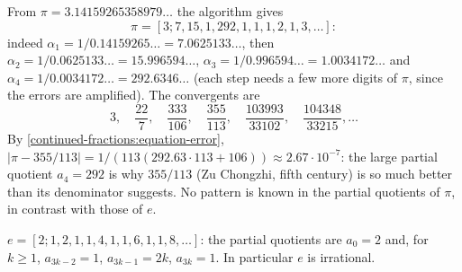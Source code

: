 \begin{example}\label{continued-fractions:example-pi}
From $\pi = 3.14159265358979\ldots$ the algorithm gives
\[
\pi = [3; 7, 15, 1, 292, 1, 1, 1, 2, 1, 3, \ldots]:
\]
indeed $\alpha_1 = 1/0.14159265\ldots = 7.0625133\ldots$, then $\alpha_2 = 1/0.0625133\ldots = 15.996594\ldots$, $\alpha_3 = 1/0.996594\ldots = 1.0034172\ldots$ and
$\alpha_4 = 1/0.0034172\ldots = 292.6346\ldots$ (each step needs a few more digits of $\pi$, since the errors are amplified). The convergents are
\[
3, \quad \frac{22}{7}, \quad \frac{333}{106}, \quad \frac{355}{113}, \quad \frac{103993}{33102}, \quad \frac{104348}{33215}, \ldots
\]
By \eqref{continued-fractions:equation-error}, $|\pi - 355/113| = 1/(113(292.63 \cdot 113 + 106)) \approx 2.67 \cdot 10^{-7}$: the large partial quotient $a_4 = 292$ is why $355/113$ (Zu Chongzhi,
fifth century) is so much better than its denominator suggests. No pattern is known in the partial quotients of $\pi$, in contrast with those of $e$.
\end{example}

\begin{theorem}[Euler]\label{continued-fractions:theorem-e}
$e = [2; 1, 2, 1, 1, 4, 1, 1, 6, 1, 1, 8, \ldots]$: the partial quotients are $a_0 = 2$ and, for $k \geq 1$, $a_{3k-2} = 1$, $a_{3k-1} = 2k$, $a_{3k} = 1$. In particular $e$ is irrational.
\end{theorem}

